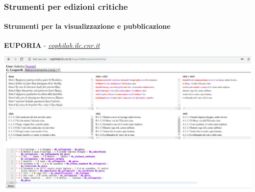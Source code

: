 \begin{frame}
    \frametitle{Strumenti per edizioni critiche}
    \framesubtitle{Strumenti per la visualizzazione e pubblicazione}
    \addtocounter{nframe}{1}
    
    \begin{center}
        \textbf{EUPORIA} -  \textit{\url{cophilab.ilc.cnr.it}}
    \end{center}
    
    \begin{center}
        \includegraphics[width=.95\textwidth]{imgs/euporia.png}
	\end{center}
\end{frame}

